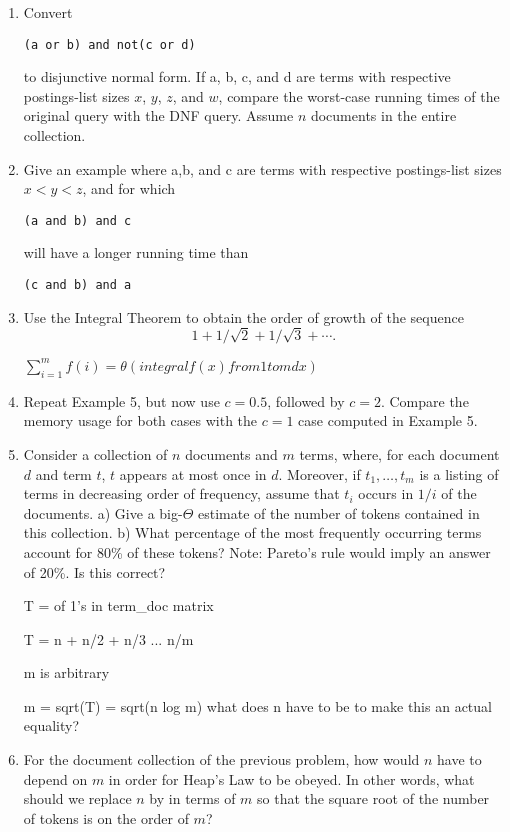\documentclass{article}
\begin{document}
\begin{enumerate}
\item Convert
\begin{verbatim}
(a or b) and not(c or d)
\end{verbatim} 
to disjunctive normal form. If a, b, c, and d are terms with respective postings-list sizes 
$x$, $y$, $z$, and $w$, compare the worst-case running times of the original query
with the DNF query. Assume $n$ documents in the entire collection.

\item Give an example where a,b, and c are terms with respective postings-list sizes
$x < y < z$, and for which 
\begin{verbatim}
(a and b) and c
\end{verbatim} 
will have a longer running time than
\begin{verbatim}
(c and b) and a
\end{verbatim}

\item Use the Integral Theorem to obtain the order of growth of the sequence
\[1+1/\sqrt{2}+1/\sqrt{3}+\cdots.\]

$\sum_{i=1}^m f(i) = \theta (integral f(x) from 1 to m dx)$

\item Repeat Example 5, but now use $c=0.5$, followed by $c=2$. Compare the memory usage
for both cases with the $c=1$ case computed in Example 5.


\item Consider a collection of $n$ documents and $m$ terms, where, for each document $d$ and term $t$, $t$ appears
at most once in $d$. Moreover, if $t_{1},\ldots,t_{m}$ is a listing of terms in decreasing order of frequency, assume that
$t_{i}$ occurs in $1/i$ of the documents. a) Give a big-$\Theta$ estimate of the number of tokens contained in this collection. b) What percentage of the most frequently occurring terms account for 80\% of these tokens? Note: Pareto's
rule would imply an answer of 20\%. Is this correct?

T =  of 1's in term\_doc matrix

T = n + n/2 + n/3 ... n/m

m is arbitrary

m = sqrt(T) = sqrt(n log m) what does n have to be to make this an actual equality?

\item For the document collection of the previous problem, how would $n$ have to depend on $m$ in order for Heap's Law
to be obeyed. In other words, what should we replace $n$ by in terms of $m$ so that the square root of the number of
tokens is on the order of $m$? 




\end{enumerate}
\end{document}
